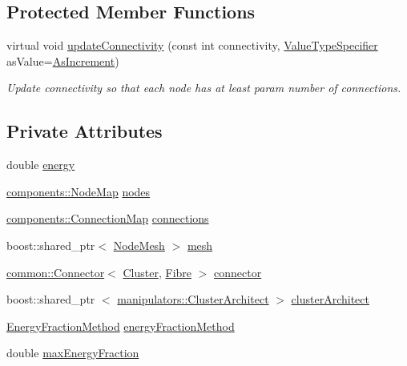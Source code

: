 \subsection*{\-Protected \-Member \-Functions}
\begin{DoxyCompactItemize}
\item 
virtual void \hyperlink{classcryomesh_1_1structures_1_1Cluster_aee616cbf1d49223eb46ea32bfaadf8f0}{update\-Connectivity} (const int connectivity, \hyperlink{classcryomesh_1_1structures_1_1Cluster_af2978a9bf2737e5e701600af095ea88f}{\-Value\-Type\-Specifier} as\-Value=\hyperlink{classcryomesh_1_1structures_1_1Cluster_af2978a9bf2737e5e701600af095ea88fa98f7c71ef7e91da5a913638aa7d56945}{\-As\-Increment})
\begin{DoxyCompactList}\small\item\em \-Update connectivity so that each node has at least param number of connections. \end{DoxyCompactList}\end{DoxyCompactItemize}
\subsection*{\-Private \-Attributes}
\begin{DoxyCompactItemize}
\item 
double \hyperlink{classcryomesh_1_1structures_1_1Cluster_a28fb86dc636571345e27da1cb544a939}{energy}
\item 
\hyperlink{classcryomesh_1_1components_1_1NodeMap}{components\-::\-Node\-Map} \hyperlink{classcryomesh_1_1structures_1_1Cluster_aebd26b5e561d3616ff3564cea8f6abfd}{nodes}
\item 
\hyperlink{classcryomesh_1_1components_1_1ConnectionMap}{components\-::\-Connection\-Map} \hyperlink{classcryomesh_1_1structures_1_1Cluster_ac614788bbfa9961f1f462d1caf7d0405}{connections}
\item 
boost\-::shared\-\_\-ptr$<$ \hyperlink{classcryomesh_1_1structures_1_1NodeMesh}{\-Node\-Mesh} $>$ \hyperlink{classcryomesh_1_1structures_1_1Cluster_a3f1688d1e47d783356c4d4705bd3f0b7}{mesh}
\item 
\hyperlink{classcryomesh_1_1common_1_1Connector}{common\-::\-Connector}$<$ \hyperlink{classcryomesh_1_1structures_1_1Cluster}{\-Cluster}, \hyperlink{classcryomesh_1_1structures_1_1Fibre}{\-Fibre} $>$ \hyperlink{classcryomesh_1_1structures_1_1Cluster_aaaaac972efefc911d4550799c752730d}{connector}
\item 
boost\-::shared\-\_\-ptr\*
$<$ \hyperlink{classcryomesh_1_1manipulators_1_1ClusterArchitect}{manipulators\-::\-Cluster\-Architect} $>$ \hyperlink{classcryomesh_1_1structures_1_1Cluster_a0cc03a8bb5375e90ad6a51e715c137a5}{cluster\-Architect}
\item 
\hyperlink{classcryomesh_1_1structures_1_1Cluster_a69c420b79675c6ffc9a0df8381ca9497}{\-Energy\-Fraction\-Method} \hyperlink{classcryomesh_1_1structures_1_1Cluster_a9faa149cba43092142147d8deaf0826c}{energy\-Fraction\-Method}
\item 
double \hyperlink{classcryomesh_1_1structures_1_1Cluster_aff9209e98a7a6aedad83dacaaf1b83a6}{max\-Energy\-Fraction}
\end{DoxyCompactItemize}
